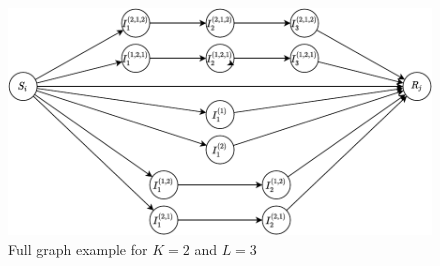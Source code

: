 \begin{figure}[H]
    \begin{center}
    \includegraphics[width=\textwidth]{figures/approach/figGraph.pdf}
    \end{center}
    \caption[Full graph example for $K=2$ and $L=3$]{Full graph example for $K=2$ and $L=3$}
    \label{fig:graph}
\end{figure}
